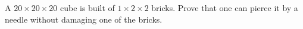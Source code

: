 A $20 \times 20 \times 20$ cube is built of $1 \times 2 \times 2$ bricks. Prove that one can pierce it by a needle without damaging one of the bricks.
